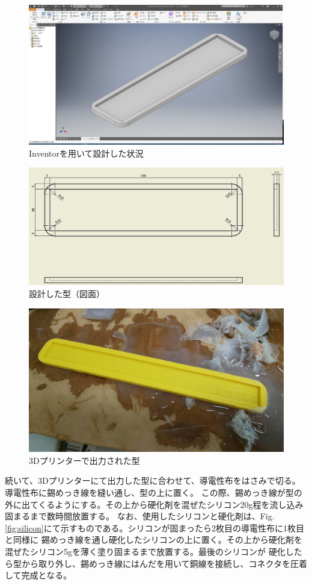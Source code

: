 \begin{figure}[h]
    \begin{center}
     \includegraphics[width=0.6\columnwidth,clip]{./2_measurement/inventor.eps}
     \caption{Inventorを用いて設計した状況}
     \label{fig:Inventor}
    \end{center}
\end{figure}
\begin{figure}[h]
    \begin{center}
        \includegraphics[width=0.6\columnwidth,clip]{./2_measurement/drowing.eps}
        \caption{設計した型（図面）}
        \label{fig:3Dprinter}
    \end{center}
\end{figure}
\begin{figure}[h]
    \begin{center}
        \includegraphics[width=0.6\columnwidth,clip]{./2_measurement/3dprint.eps}
        \caption{3Dプリンターで出力された型}
        \label{fig:3Dprinter}
    \end{center}
\end{figure}

\newpage
続いて、3Dプリンターにて出力した型に合わせて、導電性布をはさみで切る。導電性布に錫めっき線を縫い通し、型の上に置く。
この際、錫めっき線が型の外に出てくるようにする。その上から硬化剤を混ぜたシリコン20g程を流し込み固まるまで数時間放置する。
なお、使用したシリコンと硬化剤は、Fig.\ref{fig:silicon}にて示すものである。シリコンが固まったら2枚目の導電性布に1枚目と同様に
錫めっき線を通し硬化したシリコンの上に置く。その上から硬化剤を混ぜたシリコン5gを薄く塗り固まるまで放置する。最後のシリコンが
硬化したら型から取り外し、錫めっき線にはんだを用いて銅線を接続し、コネクタを圧着して完成となる。

